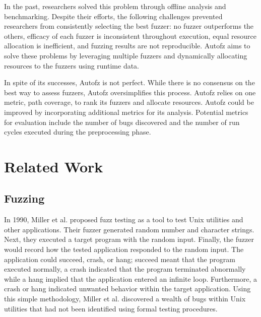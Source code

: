 In the past, researchers solved this problem through offline analysis and benchmarking. Despite their efforts, the following challenges prevented researchers from consistently selecting the best fuzzer: no fuzzer outperforms the others, efficacy of each fuzzer is inconsistent throughout execution, equal resource allocation is inefficient, and fuzzing results are not reproducible. Autofz aims to solve these problems by leveraging multiple fuzzers and dynamically allocating resources to the fuzzers using runtime data. 

In spite of its successes, Autofz is not perfect. While there is no consensus on the best way to assess fuzzers, Autofz oversimplifies this process. Autofz relies on one metric, path coverage, to rank its fuzzers and allocate resources. Autofz could be improved by incorporating additional metrics for its analysis. Potential metrics for evaluation include the number of bugs discovered and the number of run cycles executed during the preprocessing phase.

\section{Related Work}

\subsection{Fuzzing}
In 1990, Miller et al. proposed fuzz testing as a tool to test Unix utilities and other applications. Their fuzzer generated random number and character strings. Next, they executed a target program with the random input. Finally, the fuzzer would record how the tested application responded to the random input. The application could succeed, crash, or hang; succeed meant that the program executed normally, a crash indicated that the program terminated abnormally while a hang implied that the application entered an infinite loop. Furthermore, a crash or hang indicated unwanted behavior within the target application. Using this simple methodology, Miller et al. discovered a wealth of bugs within Unix utilities that had not been identified using formal testing procedures. \cite{Miller}

